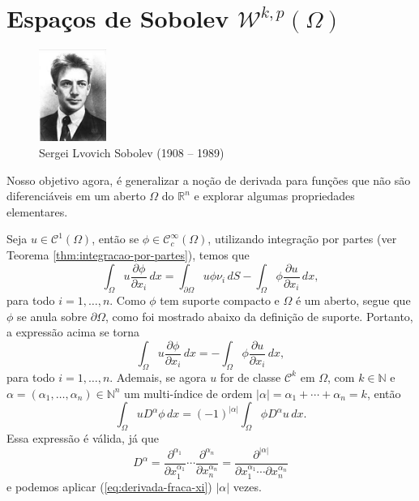 \documentclass[a4paper, 11pt]{book}
\theoremstyle{definition}
\newcommand{\bN}{\mathbb{N}}
\newcommand{\bR}{\mathbb{R}}
\newcommand{\cC}{\mathcal{C}}
\newcommand{\cW}{\mathcal{W}}
\begin{document}
\section{Espaços de Sobolev $\cW^{k,p}(\Omega)$}

\begin{figure}
    \centering
    \includegraphics[height=3cm]{sobolev.jpg}
    \caption{Sergei Lvovich Sobolev (1908 -- 1989)}
\end{figure}

Nosso objetivo agora, é generalizar a noção de derivada para funções que não são diferenciáveis em um aberto $\Omega$ do $\bR^n$ e explorar algumas propriedades elementares.

Seja $u \in \cC^1(\Omega)$, então se $\phi \in \cC^\infty_c(\Omega)$, utilizando integração por partes (ver Teorema \ref{thm:integracao-por-partes}), temos que
\[
    \int_\Omega u \dfrac{\partial \phi}{\partial x_i} \,dx = \int_{\partial\Omega} u\phi \nu_i \, dS- \int_\Omega \phi \dfrac{\partial u}{\partial x_i} \,dx,
\]
para todo $i = 1,\dots,n$. Como $\phi$ tem suporte compacto e $\Omega$ é um aberto, segue que $\phi$ se anula sobre $\partial\Omega$, como foi mostrado abaixo da definição de suporte. Portanto, a expressão acima se torna
\begin{equation} \label{eq:derivada-fraca-xi}
    \int_\Omega u \dfrac{\partial \phi}{\partial x_i} \,dx = - \int_\Omega \phi \dfrac{\partial u}{\partial x_i} \,dx,
\end{equation}
para todo $i = 1,\dots,n$.
Ademais, se agora $u$ for de classe $\cC^k$ em $\Omega$, com $k \in \bN$ e $\alpha = (\alpha_1,\dots,\alpha_n) \in \bN^n$ um multi-índice de ordem $|\alpha| = \alpha_1 + \cdots + \alpha_n = k$, então
\begin{equation} \label{eq:derivada-fraca-dalpha}
    \int_\Omega u D^\alpha \phi \,dx = (-1)^{|\alpha|} \int_\Omega \phi D^\alpha u \,dx.
\end{equation}
Essa expressão é válida, já que
\[
    D^\alpha = \dfrac{\partial^{\alpha_1} }{\partial x_1^{\alpha_1}} \cdots \dfrac{\partial^{\alpha_n} }{\partial x_n^{\alpha_n}} = \dfrac{\partial^{|\alpha|} }{\partial x_1^{\alpha_1} \cdots \partial x_n^{\alpha_n}}
\]
e podemos aplicar (\ref{eq:derivada-fraca-xi}) $|\alpha|$ vezes.
\end{document}
